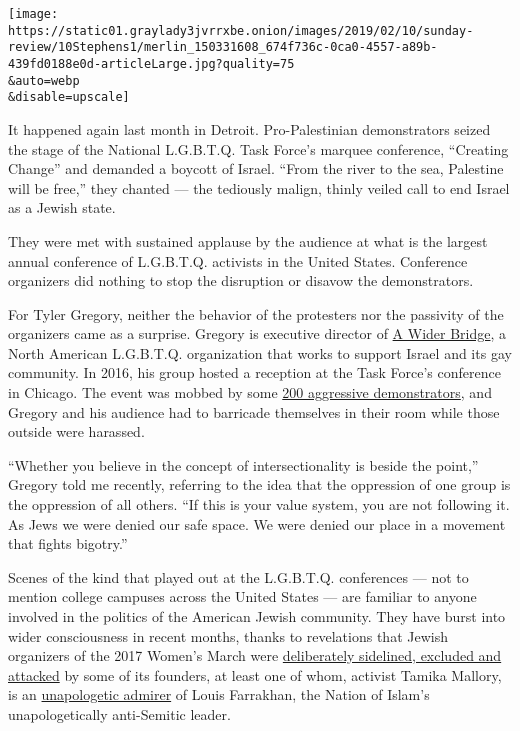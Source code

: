 \texttt{[image: https://static01.graylady3jvrrxbe.onion/images/2019/02/10/sunday-review/10Stephens1/merlin\_150331608\_674f736c-0ca0-4557-a89b-439fd0188e0d-articleLarge.jpg?quality=75\\\&auto=webp\\\&disable=upscale]}

It happened again last month in Detroit. Pro-Palestinian demonstrators
seized the stage of the National L.G.B.T.Q. Task Force's marquee
conference, ``Creating Change'' and demanded a boycott of Israel. ``From
the river to the sea, Palestine will be free,'' they chanted --- the
tediously malign, thinly veiled call to end Israel as a Jewish state.

They were met with sustained applause by the audience at what is the
largest annual conference of L.G.B.T.Q. activists in the United States.
Conference organizers did nothing to stop the disruption or disavow the
demonstrators.

For Tyler Gregory, neither the behavior of the protesters nor the
passivity of the organizers came as a surprise. Gregory is executive
director of \href{https://awiderbridge.org/}{A Wider Bridge}, a North
American L.G.B.T.Q. organization that works to support Israel and its
gay community. In 2016, his group hosted a reception at the Task Force's
conference in Chicago. The event was mobbed by some
\href{https://www.youtube.com/watch?v=Rz4KkvvjBB8\&feature=youtu.be}{200
aggressive demonstrators}, and Gregory and his audience had to barricade
themselves in their room while those outside were harassed.

``Whether you believe in the concept of intersectionality is beside the
point,'' Gregory told me recently, referring to the idea that the
oppression of one group is the oppression of all others. ``If this is
your value system, you are not following it. As Jews we were denied our
safe space. We were denied our place in a movement that fights
bigotry.''

Scenes of the kind that played out at the L.G.B.T.Q. conferences --- not
to mention college campuses across the United States --- are familiar to
anyone involved in the politics of the American Jewish community. They
have burst into wider consciousness in recent months, thanks to
revelations that Jewish organizers of the 2017 Women's March were
\href{https://www.tabletmag.com/jewish-news-and-politics/276694/is-the-womens-march-melting-down}{deliberately
sidelined, excluded and attacked} by some of its founders, at least one
of whom, activist Tamika Mallory, is an
\href{https://www.nationalreview.com/news/tamika-mallory-defends-decision-to-praise-farrakhan-as-the-greatest-of-all-time/}{unapologetic
admirer} of Louis Farrakhan, the Nation of Islam's unapologetically
anti-Semitic leader.

